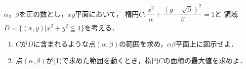 \documentclass[../../main.tex]{subfiles}
\begin{document}
$\alpha$，$\beta$を正の数とし，$xy$平面において，
楕円$\displaystyle C:\dfrac{x^2}{\alpha}+\dfrac{{(y-\sqrt\beta)}^2}{\beta}=1$と
領域$D=\{(x,y)|x^2+y^2\leqq1\}$を考える．
\begin{enumerate}
  \item $C$が$D$に含まれるような点$(\alpha,\beta)$の範囲を求め，$\alpha\beta$平面上に図示せよ．
  \item 点$(\alpha,\beta)$が(1)で求めた範囲を動くとき，楕円$C$の面積の最大値を求めよ．
\end{enumerate}
\end{document}
